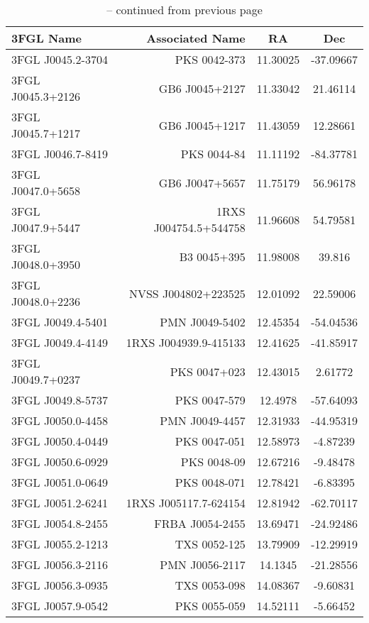 \begin{table} \ContinuedFloat
\centering
\caption{-- continued from previous page}
\tiny

\begin{tabular}{l r c c}
\toprule
3FGL Name & Associated Name & RA & Dec \\
\midrule
3FGL J0045.2-3704  &  PKS 0042-373  &  11.30025  &  -37.09667  \\
3FGL J0045.3+2126  &  GB6 J0045+2127  &  11.33042  &  21.46114  \\
3FGL J0045.7+1217  &  GB6 J0045+1217  &  11.43059  &  12.28661  \\
3FGL J0046.7-8419  &  PKS 0044-84  &  11.11192  &  -84.37781  \\
3FGL J0047.0+5658  &  GB6 J0047+5657  &  11.75179  &  56.96178  \\
3FGL J0047.9+5447  &  1RXS J004754.5+544758  &  11.96608  &  54.79581  \\
3FGL J0048.0+3950  &  B3 0045+395  &  11.98008  &  39.816  \\
3FGL J0048.0+2236  &  NVSS J004802+223525  &  12.01092  &  22.59006  \\
3FGL J0049.4-5401  &  PMN J0049-5402  &  12.45354  &  -54.04536  \\
3FGL J0049.4-4149  &  1RXS J004939.9-415133  &  12.41625  &  -41.85917  \\
3FGL J0049.7+0237  &  PKS 0047+023  &  12.43015  &  2.61772  \\
3FGL J0049.8-5737  &  PKS 0047-579  &  12.4978  &  -57.64093  \\
3FGL J0050.0-4458  &  PMN J0049-4457  &  12.31933  &  -44.95319  \\
3FGL J0050.4-0449  &  PKS 0047-051  &  12.58973  &  -4.87239  \\
3FGL J0050.6-0929  &  PKS 0048-09  &  12.67216  &  -9.48478  \\
3FGL J0051.0-0649  &  PKS 0048-071  &  12.78421  &  -6.83395  \\
3FGL J0051.2-6241  &  1RXS J005117.7-624154  &  12.81942  &  -62.70117  \\
3FGL J0054.8-2455  &  FRBA J0054-2455  &  13.69471  &  -24.92486  \\
3FGL J0055.2-1213  &  TXS 0052-125  &  13.79909  &  -12.29919  \\
3FGL J0056.3-2116  &  PMN J0056-2117  &  14.1345  &  -21.28556  \\
3FGL J0056.3-0935  &  TXS 0053-098  &  14.08367  &  -9.60831  \\
3FGL J0057.9-0542  &  PKS 0055-059  &  14.52111  &  -5.66452  \\

\end{tabular}
\end{table}
